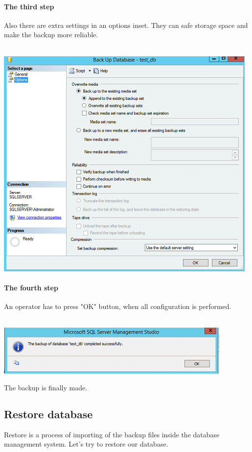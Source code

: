 \documentclass[english]{article}
\begin{document}
\paragraph{The third step} Also there are extra settings in an options inset. They can safe storage space and make the backup more reliable.\\\\
\centerline{\includegraphics[scale=0.8]{administration/3}}
\paragraph{The fourth step} An operator has to press "OK" button, when all configuration is performed.\\\\
\centerline{\includegraphics[scale=0.8]{administration/4}}
The backup is finally made.


\subsection{Restore database}
Restore is a process of importing of the backup files inside the database management system. Let's try to restore our database.
\end{document}
